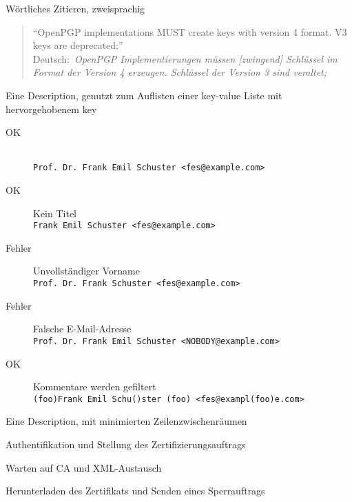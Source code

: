 \begin{formal}
	Wörtliches Zitieren, zweisprachig
\end{formal}
\begin{quotation}
"`OpenPGP implementations MUST create keys with version 4 format. V3 keys are deprecated;"'~\cite[S.40]{rfc4880}\\
Deutsch:~\emph{OpenPGP Implementierungen müssen [zwingend] Schlüssel im Format der Version 4 erzeugen. Schlüssel der Version 3 sind veraltet;}
\end{quotation}



\begin{formal}
	Eine Description, genutzt zum Auflisten einer key-value Liste mit hervorgehobenem key 
\end{formal}
\begin{description}
	\item[OK]\hfill\\\verb|Prof. Dr. Frank Emil Schuster <fes@example.com>|
	\item[OK] Kein Titel\\\verb|Frank Emil Schuster <fes@example.com>|
	\item[Fehler] Unvollständiger Vorname\\\verb|Prof. Dr. Frank Schuster <fes@example.com>|
	\item[Fehler] Falsche E-Mail-Adresse\\\verb|Prof. Dr. Frank Emil Schuster <NOBODY@example.com>|
	\item[OK] Kommentare werden gefiltert\\\verb|(foo)Frank Emil Schu()ster (foo) <fes@exampl(foo)e.com>|
\end{description}

\begin{formal}
	Eine Description, mit minimierten Zeilenzwischenräumen
\end{formal}
\begin{description}[noitemsep]
	\item[$\approx$ 3s] Authentifikation und Stellung des Zertifizierungsauftrags
	\item[$\approx$ 2s bis 48s] Warten auf CA und XML-Austausch
	\item[$\approx$ 300ms] Herunterladen des Zertifikats und Senden eines Sperrauftrags
\end{description}




